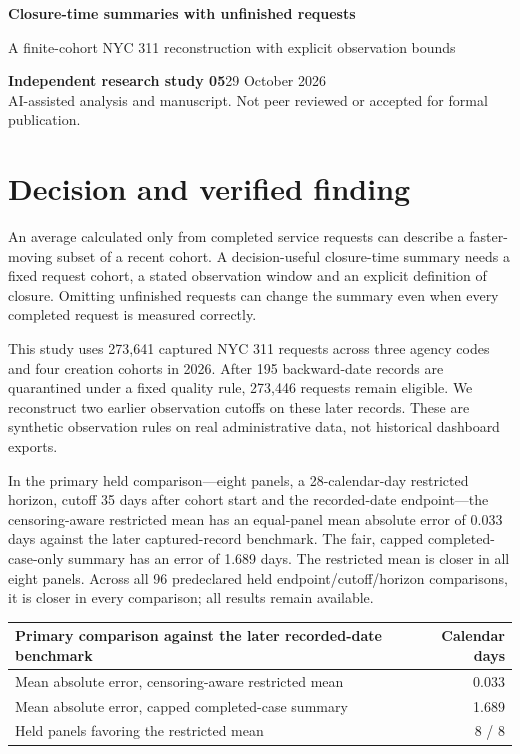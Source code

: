 \documentclass[10pt,letterpaper]{article}
\begin{document}
\color{ink}
{\LARGE\bfseries Closure-time summaries with unfinished requests\par}
{\large A finite-cohort NYC 311 reconstruction with explicit observation bounds\par}
\textbf{Independent research study 05}\hfill29 October 2026\\
AI-assisted analysis and manuscript. Not peer reviewed or accepted for formal publication.

\section*{Decision and verified finding}
An average calculated only from completed service requests can describe a faster-moving subset of a recent cohort. A decision-useful closure-time summary needs a fixed request cohort, a stated observation window and an explicit definition of closure. Omitting unfinished requests can change the summary even when every completed request is measured correctly.

This study uses 273,641 captured NYC 311 requests across three agency codes and four creation cohorts in 2026. After 195 backward-date records are quarantined under a fixed quality rule, 273,446 requests remain eligible. We reconstruct two earlier observation cutoffs on these later records. These are synthetic observation rules on real administrative data, not historical dashboard exports.

In the primary held comparison---eight panels, a 28-calendar-day restricted horizon, cutoff 35 days after cohort start and the recorded-date endpoint---the censoring-aware restricted mean has an equal-panel mean absolute error of 0.033 days against the later captured-record benchmark. The fair, capped completed-case-only summary has an error of 1.689 days. The restricted mean is closer in all eight panels. Across all 96 predeclared held endpoint/cutoff/horizon comparisons, it is closer in every comparison; all results remain available.

\begin{center}\begin{tabularx}{\linewidth}{Xr}\toprule
Primary comparison against the later recorded-date benchmark & Calendar days\\\midrule
Mean absolute error, censoring-aware restricted mean & 0.033\\
Mean absolute error, capped completed-case summary & 1.689\\
Held panels favoring the restricted mean & 8 / 8\\\bottomrule
\end{tabularx}\end{center}
\end{document}
